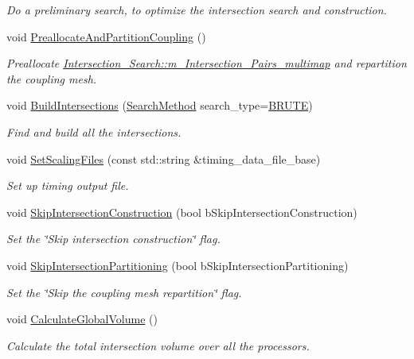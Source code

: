 \begin{DoxyCompactItemize}
\begin{DoxyCompactList}\small\item\em Do a preliminary search, to optimize the intersection search and construction. \end{DoxyCompactList}\item 
void \hyperlink{classcarl_1_1_intersection___search_a7928e94f8406b75be9887427fd0da9bc}{Preallocate\+And\+Partition\+Coupling} ()
\begin{DoxyCompactList}\small\item\em Preallocate \hyperlink{classcarl_1_1_intersection___search_a21bb47bfa3021d18b718919ad4a245d7}{Intersection\+\_\+\+Search\+::m\+\_\+\+Intersection\+\_\+\+Pairs\+\_\+multimap} and repartition the coupling mesh. \end{DoxyCompactList}\item 
void \hyperlink{classcarl_1_1_intersection___search_aa84f57dd84826955813efe60c87d199d}{Build\+Intersections} (\hyperlink{namespacecarl_a2c9d0282cb533624e034ccc1d7b629c7}{Search\+Method} search\+\_\+type=\hyperlink{namespacecarl_a2c9d0282cb533624e034ccc1d7b629c7a795a195e14566a465c90e47e4f389447}{B\+R\+U\+T\+E})
\begin{DoxyCompactList}\small\item\em Find and build all the intersections. \end{DoxyCompactList}\item 
void \hyperlink{classcarl_1_1_intersection___search_ada98ea0155e0d69ed41d82c2a5deb2c5}{Set\+Scaling\+Files} (const std\+::string \&timing\+\_\+data\+\_\+file\+\_\+base)
\begin{DoxyCompactList}\small\item\em Set up timing output file. \end{DoxyCompactList}\item 
void \hyperlink{classcarl_1_1_intersection___search_a0b3d08e62e3585c6ce90f7849763f9d0}{Skip\+Intersection\+Construction} (bool b\+Skip\+Intersection\+Construction)
\begin{DoxyCompactList}\small\item\em Set the \char`\"{}\+Skip intersection construction\char`\"{} flag. \end{DoxyCompactList}\item 
void \hyperlink{classcarl_1_1_intersection___search_aab5906eb9b33464dcc60d5f66f06b9dc}{Skip\+Intersection\+Partitioning} (bool b\+Skip\+Intersection\+Partitioning)
\begin{DoxyCompactList}\small\item\em Set the \char`\"{}\+Skip the coupling mesh repartition\char`\"{} flag. \end{DoxyCompactList}\item 
void \hyperlink{classcarl_1_1_intersection___search_afd7f0a6be00190708c9deb484617d24a}{Calculate\+Global\+Volume} ()
\begin{DoxyCompactList}\small\item\em Calculate the total intersection volume over all the processors. \end{DoxyCompactList}\end{DoxyCompactItemize}
